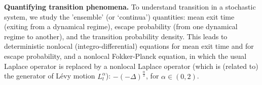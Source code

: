 \documentclass[11pt]{NSFamsart}
\begin{document}



 
\textbf{Quantifying transition phenomena.}
To understand transition   in    a stochastic system, we  study the     'ensemble' (or `continua') quantities: mean exit time (exiting from a dynamical regime),   escape probability (from one dynamical regime to another),    and  the transition  probability density.
This leads to deterministic  nonlocal (integro-differential) equations for mean exit time and for escape probability, and a nonlocal Fokker-Planck equation,
in which the usual Laplace operator is replaced
by a nonlocal   Laplace operator (which is (related to) the generator of L\'evy motion $L_t^\alpha$):  $-(-\Delta)^{\frac{\alpha}2  }$, for $\alpha \in (0, 2)$.
 
\end{document}
